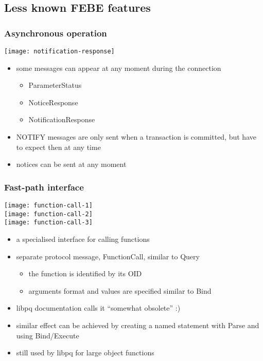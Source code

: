 \documentclass{beamer}
\begin{document}
\subsection{Less known FEBE features}
\begin{frame}
  \frametitle{Asynchronous operation}

  \begin{center}
    \texttt{[image: notification-response]}
  \end{center}

  \begin{itemize}
  \item some messages can appear at any moment during the connection
    \begin{itemize}
    \item ParameterStatus
    \item NoticeResponse
    \item NotificationResponse
    \end{itemize}
  \item NOTIFY messages are only sent when a transaction is committed, but have
    to expect then at any time
  \item notices can be sent at any moment
  \end{itemize}
\end{frame}

\begin{frame}
  \frametitle{Fast-path interface}

  \hspace{1cm}\texttt{[image: function-call-1]}\;\raisebox{0.2cm}{$+$} \\
  \hspace{1cm}\texttt{[image: function-call-2]}\;\raisebox{0.2cm}{$+$} \\
  \hspace{1cm}\texttt{[image: function-call-3]}

  \begin{itemize}
  \item a specialised interface for calling functions
  \item separate protocol message, FunctionCall, similar to Query
    \begin{itemize}
    \item the function is identified by its OID
    \item arguments format and values are specified similar to Bind
    \end{itemize}
  \item libpq documentation calls it ``somewhat obsolete'' :)
  \item similar effect can be achieved by creating a named statement with Parse
    and using Bind/Execute
  \item still used by libpq for large object functions
  \end{itemize}
\end{frame}
\end{document}
